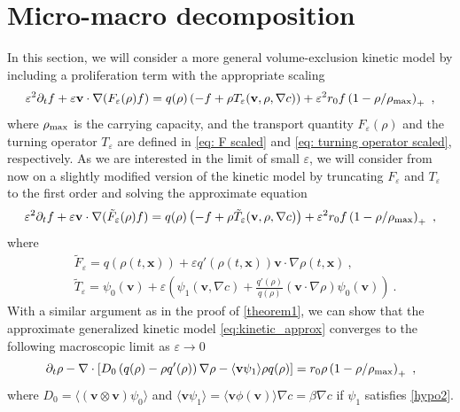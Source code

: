 \documentclass[review,onefignum,onetabnum]{siamart220329}
\newcommand {\e}  {\varepsilon}
\newcommand {\bv} { {\mathbf{v}} }
\newcommand {\bx} { {\mathbf{x}} }
\newcommand {\p}   {\partial}
\newcommand{\beq}{\begin{equation}}
\newcommand{\eeq}{\end{equation}}
\begin{document}
\section{Micro-macro decomposition}\label{sec:micro-macro}
In this section, we will consider a more general volume-exclusion kinetic model by including a proliferation term with the appropriate scaling
\begin{equation*}
	\e^2 \p_t f + \e \bv \cdot \nabla(F_\varepsilon(\rho)f) = q(\rho) \left(-f + \rho T_\varepsilon(\bv, \rho, \nabla c)\right) + \e^2 r_0f\left(1-\rho/\rho_{\textnormal{max}}\right)_+\ ,
\end{equation*}
where  $\rho_{\textnormal{max}}$ is the carrying capacity, and the transport quantity $F_\varepsilon(\rho)$ and the turning operator $T_\varepsilon$ are defined in \cref{eq: F scaled} and \cref{eq: turning operator scaled}, respectively. 
{As we are interested in the limit of small $\varepsilon$, we will consider from now on a slightly modified version of the kinetic model by truncating $F_\varepsilon$ and $T_\varepsilon$ to the first order and solving the approximate equation 
\beq
\label{eq:kinetic_approx}
	\e^2 \p_t f + \e \bv \cdot \nabla(\tilde{F}_\varepsilon(\rho)f) = q(\rho) \left(-f + \rho \tilde{T}_\varepsilon(\bv, \rho, \nabla c)\right) + \e^2 r_0f\left(1-\rho/\rho_{\textnormal{max}}\right)_+\ ,
\eeq
where
\begin{align*}
    &\tilde{F}_\varepsilon = q(\rho(t,\bx)) + \varepsilon q'(\rho(t,\bx))\bv\cdot\nabla\rho(t,\bx)\ ,\\
    &\tilde{T}_\varepsilon = \psi_0(\bv) + \varepsilon\left(\psi_1(\bv,\nabla c) + \frac{q'(\rho)}{q(\rho)}(\bv\cdot\nabla\rho)\psi_0(\bv)\right)\ .
\end{align*}}
With a similar argument as in the proof of \cref{theorem1}, we can show that the approximate generalized kinetic model \cref{eq:kinetic_approx} converges to the following macroscopic limit as $\varepsilon\to 0$
\beq
\label{eq:limit}
	\p_t \rho - \nabla \cdot \left[D_0\left(q(\rho)-\rho q'(\rho) \right)\nabla \rho-\langle\bv\psi_1\rangle\rho q(\rho)\right] = r_0 \rho\left(1 - \rho/\rho_{\rm max}\right)_+\ ,
\eeq
where $D_0 = \langle(\bv\otimes\bv)\psi_0\rangle$ and $\langle \mathbf{v}\psi_1 \rangle=\langle \mathbf{v}\phi(\mathbf{v})\rangle\nabla c=\beta\nabla c$ if $\psi_1$ satisfies \cref{hypo2}.
\end{document}
